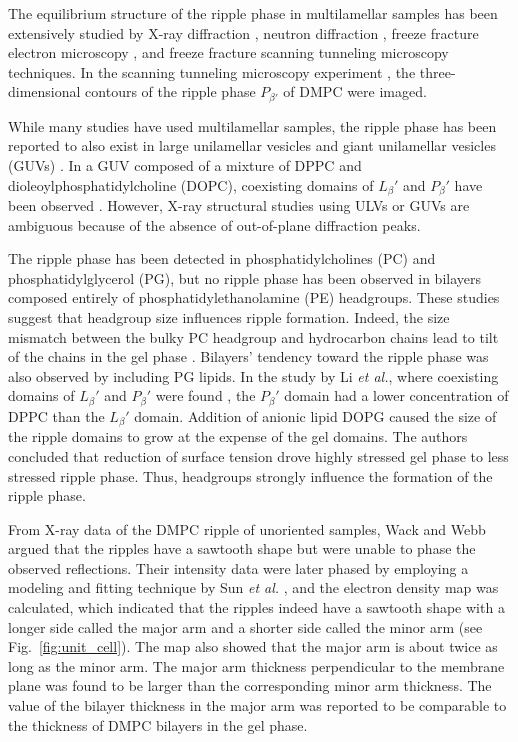 The equilibrium structure of the ripple phase in multilamellar samples has been 
extensively studied by
X-ray diffraction \cite{ref:Janiak76,ref:Janiak79,ref:Tardieu73,ref:Wack89,ref:Yao91,ref:Sun96,ref:Cunningham98,
ref:Sengupta99,ref:Sengupta00,ref:Sengupta03},
neutron diffraction \cite{ref:Mortensen88,ref:Bradshaw89,ref:Mason99}, 
freeze fracture electron microscopy \cite{ref:Woodward96,ref:Copeland80,ref:Ruppel83},
and freeze fracture scanning tunneling microscopy \cite{ref:Zasadzinski88} techniques.
In the scanning tunneling microscopy experiment \cite{ref:Zasadzinski88}, 
the three-dimensional contours of the ripple phase $P_{\beta'}$ of
DMPC were imaged.

While many studies have used multilamellar samples, the ripple phase has been reported
to also exist in large unilamellar vesicles \cite{ref:Mason99,ref:Parente84}
and giant unilamellar vesicles (GUVs) \cite{ref:Li06}. 
In a GUV composed of a mixture of DPPC and 
dioleoylphosphatidylcholine (\acs{DOPC}), 
coexisting domains of $L_\beta'$ and $P_\beta'$ have been observed \cite{ref:Li06}.
However, X-ray structural studies using ULVs or GUVs are ambiguous
because of the absence of out-of-plane diffraction peaks. 

The ripple phase has been detected in
phosphatidylcholines (\acs{PC}) and phosphatidylglycerol (\acs{PG}),
but no ripple phase has been observed in bilayers composed entirely of 
phosphatidylethanolamine (\acs{PE}) headgroups.
These studies suggest that headgroup size influences
ripple formation. Indeed, the size mismatch
between the bulky PC headgroup and hydrocarbon chains lead to tilt of 
the chains in the gel phase \cite{ref:Nagle76,ref:Mcintosh80,Nagle00}. 
Bilayers' tendency toward the ripple phase was also observed by including PG lipids.
In the study by Li \textit{et al.}, where  
coexisting domains of $L_\beta'$ and $P_\beta'$ were found \cite{ref:Li06},
the $P_\beta'$ domain had a lower concentration of DPPC than the $L_\beta'$
domain. 
Addition of anionic lipid \acs{DOPG} caused the size of the ripple domains
to grow at the expense of the gel domains. The authors concluded that reduction of 
surface tension drove highly stressed gel phase to less stressed ripple phase.
Thus, headgroups strongly influence the formation of the ripple phase.

From X-ray data of the DMPC ripple of unoriented samples, 
Wack and Webb \cite{ref:Wack89} argued that the ripples have a sawtooth shape
but were unable to phase the observed reflections.
Their intensity data were later
phased by employing a modeling and fitting technique by Sun \textit{et al.}
\cite{ref:Sun96}, and the electron density map was calculated, which indicated that  
the ripples indeed have a sawtooth shape with a longer side called the major arm
and a shorter side called the minor arm (see Fig.~\ref{fig:unit_cell}). 
The map also showed that the major arm is about twice as long as the minor arm. 
The major arm thickness perpendicular to the membrane plane 
was found to be larger than the corresponding minor arm thickness. 
The value of the bilayer thickness in the major arm was reported
to be comparable to the thickness of DMPC bilayers in the gel phase.


